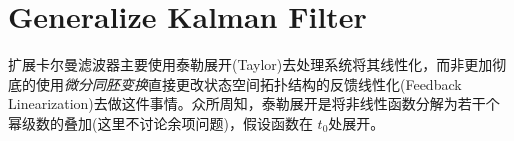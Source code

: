 \chapter{Generalize Kalman Filter}

扩展卡尔曼滤波器主要使用泰勒展开(Taylor)去处理系统将其线性化，而非更加彻底的使用\textsl{微分同胚变换}直接更改状态空间拓扑结构的反馈线性化(Feedback Linearization)去做这件事情。众所周知，泰勒展开是将非线性函数分解为若干个幂级数的叠加(这里不讨论余项问题)，假设函数在
$t_0$处展开。
